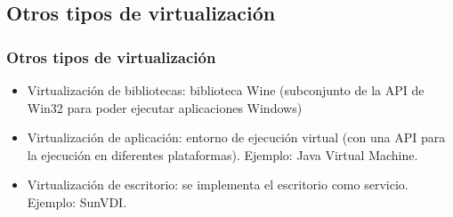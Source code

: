 \documentclass{beamer}
\begin{document}
\subsection{Otros tipos de virtualización}
\begin{frame}
  \frametitle{Otros tipos de virtualización}
  \begin{itemize}
  \item Virtualización de bibliotecas: biblioteca Wine (subconjunto de
    la API de Win32 para poder ejecutar aplicaciones Windows)
  \item Virtualización de aplicación: entorno de ejecución virtual
    (con una API para la ejecución en diferentes
    plataformas). Ejemplo: Java Virtual Machine.
  \item Virtualización de escritorio: se implementa el escritorio como
    servicio. Ejemplo: SunVDI.
  \end{itemize}
\end{frame}
\end{document}
